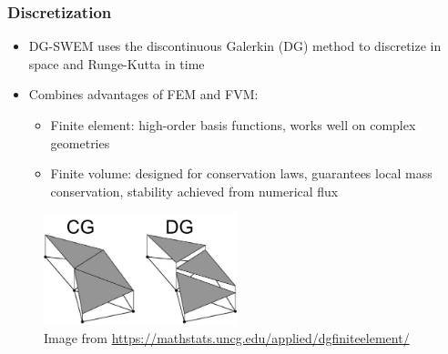 \documentclass[10pt]{oden_beamer}
\begin{document}
\begin{frame}
  \frametitle{Discretization}
  \begin{itemize}
  \item DG-SWEM uses the discontinuous Galerkin (DG) method to discretize in space and Runge-Kutta in time
  \item Combines advantages of FEM and FVM:
    \begin{itemize}
    \item Finite element: high-order basis functions, works well on complex geometries
    \item Finite volume: designed for conservation laws, guarantees local mass conservation, stability achieved from numerical flux
    \end{itemize}
  \end{itemize}
  \begin{figure}[h]
    \centering
    \includegraphics[width=0.5\textwidth]{cgdg.jpg}
    \caption*{Image from \url{https://mathstats.uncg.edu/applied/dgfiniteelement/}}
  \end{figure}
\end{frame}
\end{document}
